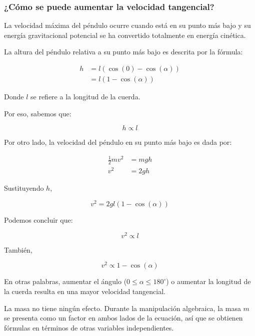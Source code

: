 \documentclass[twocolumn]{article}
\numberwithin{table}{section}
\begin{document}
\subsubsection*{¿Cómo se puede aumentar la velocidad tangencial?}

La velocidad máxima del péndulo ocurre cuando está en su punto más
bajo y su energía gravitacional potencial se ha convertido totalmente
en energía cinética.

La altura del péndulo relativa a su punto más bajo es descrita por la fórmula:

\begin{align}
  h &= l(\cos(0) - \cos(\alpha)) \nonumber \\
  &= l(1 - \cos(\alpha))
\end{align}

Donde $l$ se refiere a la longitud de la cuerda.

Por eso, sabemos que:

\begin{equation}
  h \propto l
\end{equation}

Por otro lado, la velocidad del péndulo en su punto más bajo es dada por:

\begin{align}
  \frac{1}{2}m v^{2} &= mgh \\
  v^{2} &= 2gh
\end{align}

Sustituyendo $h$,

\begin{equation}
  v^{2} = 2gl(1 - \cos(\alpha))
\end{equation}

Podemos concluir que:

\begin{equation}
  v^{2} \propto l
\end{equation}

También,

\begin{equation}
  v^{2} \propto 1 - \cos(\alpha)
\end{equation}

En otras palabras, aumentar el ángulo ($0 \leq \alpha \leq
180^{\circ}$) o aumentar la longitud de la cuerda resulta en una
mayor velocidad tangencial.

La masa no tiene ningún efecto. Durante la manipulación algebraica,
la masa $m$ se presenta como un factor en ambos lados de la ecuación,
así que se obtienen fórmulas en términos de otras variables independientes.
\end{document}
